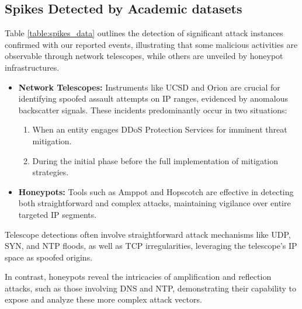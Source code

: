 
\subsection{Spikes Detected by Academic datasets}
Table \ref{table:spikes_data} outlines the detection of significant attack instances confirmed with our reported events, illustrating that some malicious activities are observable through network telescopes, while others are unveiled by honeypot infrastructures.
\begin{itemize}
\item \textbf{Network Telescopes:} Instruments like UCSD and Orion are crucial for identifying spoofed assault attempts on IP ranges, evidenced by anomalous backscatter signals. These incidents predominantly occur in two situations:
\begin{enumerate}
\item When an entity engages DDoS Protection Services for imminent threat mitigation.
\item During the initial phase before the full implementation of mitigation strategies.
\end{enumerate}
\item \textbf{Honeypots:} Tools such as Amppot and Hopscotch are effective in detecting both straightforward and complex attacks, maintaining vigilance over entire targeted IP segments. 
\end{itemize}

Telescope detections often involve straightforward attack mechanisms like UDP, SYN, and NTP floods, as well as TCP irregularities, leveraging the telescope's IP space as spoofed origins.

In contrast, honeypots reveal the intricacies of amplification and reflection attacks, such as those involving DNS and NTP, demonstrating their capability to expose and analyze these more complex attack vectors.








